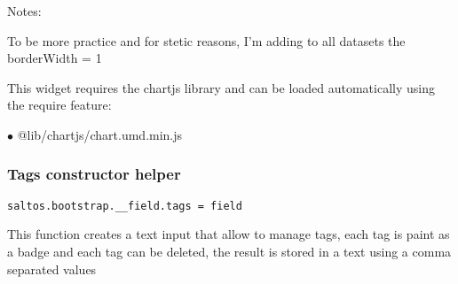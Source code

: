 \documentclass[a4paper]{article}
\begin{document}
Notes:

To be more practice and for stetic reasons, I'm adding to all datasets the borderWidth = 1

This widget requires the chartjs library and can be loaded automatically using the require
feature:

\begin{compactitem}
\item[\color{myblue}$\bullet$] @lib/chartjs/chart.umd.min.js
\end{compactitem}

\hypertarget{toc637}{}
\subsubsection{Tags constructor helper}

\begin{lstlisting}
saltos.bootstrap.__field.tags = field
\end{lstlisting}

This function creates a text input that allow to manage tags, each tag is paint as a badge
and each tag can be deleted, the result is stored in a text using a comma separated values
\end{document}
